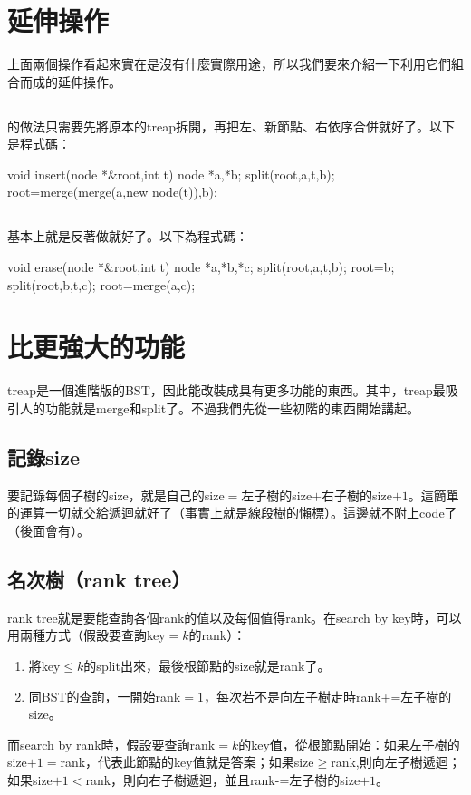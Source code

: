 \section{延伸操作}
上面兩個操作看起來實在是沒有什麼實際用途，所以我們要來介紹一下利用它們組合而成的延伸操作。
\subsection{}
的做法只需要先將原本的treap拆開，再把左、新節點、右依序合併就好了。以下是程式碼：
\begin{C++}
void insert(node *&root,int t){
	node *a,*b;
	split(root,a,t,b);
	root=merge(merge(a,new node(t)),b);
}
\end{C++}
\subsection{}
基本上就是反著做就好了。以下為程式碼：
\begin{C++}
void erase(node *&root,int t){
	node *a,*b,*c;
	split(root,a,t,b);
	root=b;
	split(root,b,t,c);
	root=merge(a,c);
}
\end{C++}
\section{比更強大的功能}
treap是一個進階版的BST，因此能改裝成具有更多功能的東西。其中，treap最吸引人的功能就是merge和split了。不過我們先從一些初階的東西開始講起。
\subsection{記錄size}
要記錄每個子樹的size，就是自己的size$=$左子樹的size$+$右子樹的size$+1$。這簡單的運算一切就交給遞迴就好了（事實上就是線段樹的懶標）。這邊就不附上code了（後面會有）。
\subsection{名次樹（rank tree）}
rank tree就是要能查詢各個rank的值以及每個值得rank。在search by key時，可以用兩種方式（假設要查詢key$=k$的rank）：
\begin{enumerate}
\item 將key$\leq k$的split出來，最後根節點的size就是rank了。
\item 同BST的查詢，一開始rank$=1$，每次若不是向左子樹走時rank+=左子樹的size。
\end{enumerate}
而search by rank時，假設要查詢rank$=k$的key值，從根節點開始：如果左子樹的size$+1=$rank，代表此節點的key值就是答案；如果size$\geq $rank,則向左子樹遞迴；如果size$+1<$rank，則向右子樹遞迴，並且rank-=左子樹的size$+1$。
